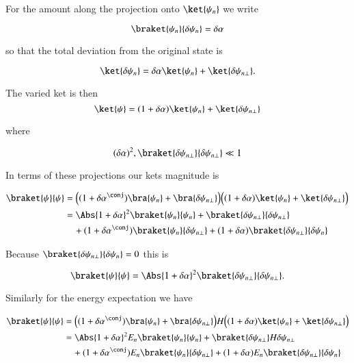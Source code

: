 For the amount along the projection onto $\ket{\psi_n}$ we write

\begin{equation}\label{eqn:qmTwoL3:30}
\braket{\psi_n}{\delta \psi_n} = \delta \alpha
\end{equation}

so that the total deviation from the original state is

\begin{equation}\label{eqn:qmTwoL3:50}
\ket{\delta \psi_n} 
= \delta \alpha \ket{\psi_n} 
+ \ket{\delta \psi_{n \perp}} .
\end{equation}

The varied ket is then
\begin{equation}\label{eqn:qmTwoL3:70}
\ket{\psi} 
= (1 + \delta \alpha )\ket{\psi_n} + \ket{\delta \psi_{n \perp}} 
\end{equation}

where

\begin{equation}\label{eqn:qmTwoL3:90}
(\delta \alpha)^2, \braket{\delta \psi_{n \perp}}{\delta \psi_{n \perp}}  \ll 1
\end{equation}

In terms of these projections our kets magnitude is

\begin{align*}
\braket{\psi}{\psi} 
&= 
\Bigl(
(1 + {\delta \alpha}^\conj )\bra{\psi_n} + \bra{\delta \psi_{n \perp}} 
\Bigr)
\Bigl(
(1 + \delta \alpha )\ket{\psi_n} + \ket{\delta \psi_{n \perp}} 
\Bigr) \\
&=
\Abs{1 + \delta \alpha}^2 \braket{\psi_n}{\psi_n}
+ 
\braket{\delta \psi_{n \perp}}{\delta \psi_{n \perp}}  \\
&\quad +
(1 + {\delta \alpha}^\conj )\braket{\psi_n}{\delta \psi_{n \perp}} 
+
(1 + \delta \alpha )\braket{\delta \psi_{n \perp}}{\delta \psi_n} 
\end{align*}

Because $\braket{\delta \psi_{n \perp}}{\delta \psi_n} = 0$ this is

\begin{equation}\label{eqn:qmTwoL3:110}
\braket{\psi}{\psi}
= 
\Abs{1 + \delta \alpha }^2
\braket{\delta \psi_{n \perp}}{\delta \psi_{n \perp}}.
\end{equation}

Similarly for the energy expectation we have

\begin{align*}
\braket{\psi}{\psi} 
&= 
\Bigl(
(1 + {\delta \alpha}^\conj )\bra{\psi_n} + \bra{\delta \psi_{n \perp}} 
\Bigr)
H
\Bigl(
(1 + \delta \alpha )\ket{\psi_n} + \ket{\delta \psi_{n \perp}} 
\Bigr) \\
&=
\Abs{1 + \delta \alpha}^2 E_n \braket{\psi_n}{\psi_n}
+ 
\braket{\delta \psi_{n \perp}} H {\delta \psi_{n \perp}}  \\
&\quad + 
(1 + {\delta \alpha}^\conj ) E_n \braket{\psi_n}{\delta \psi_{n \perp}} 
+
(1 + \delta \alpha ) E_n \braket{\delta \psi_{n \perp}}{\delta \psi_n} 
\end{align*}

